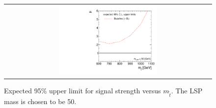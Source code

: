 \begin{figure}[!h]
  \centering
  \begin{tabular}{c}
                \includegraphics[width=0.49\textwidth]{figures/limitplot4BinSel_Baseline.pdf} 
  \end{tabular}
  \caption{Expected 95\% upper limit for signal strength versus $m_{\tilde{t}}$. The LSP mass is chosen to be 50\gev.}
  \label{fig:stop_baseline_limit}
\end{figure}


